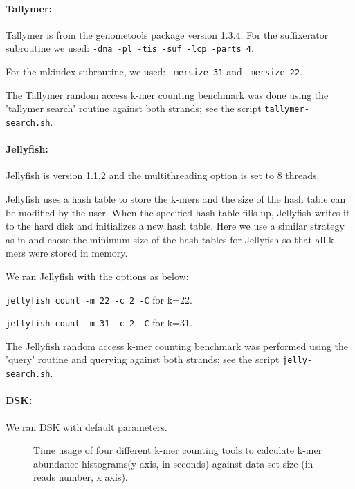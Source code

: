\documentclass{article}
\begin{document}
\paragraph{Tallymer:}
Tallymer is from the genometools package version 1.3.4. For the suffixerator subroutine we used:
{\tt -dna -pl -tis -suf -lcp -parts 4}.

For the mkindex subroutine, we used: {\tt -mersize 31} and {\tt -mersize 22}.

The Tallymer random access k-mer counting benchmark was done using the
'tallymer search' routine against both strands; see the script
{\tt tallymer-search.sh}.

\paragraph{Jellyfish:}
Jellyfish is version 1.1.2 and the multithreading option is set to 8 threads.

Jellyfish uses a hash table to store the k-mers and the size of the
hash table can be modified by the user.  When the specified hash table
fills up, Jellyfish writes it to the hard
disk and initializes a new hash table.  Here we use a
similar strategy as in \cite{Melsted2011} and chose the minimum size of the hash 
tables for Jellyfish so that all k-mers were stored in memory.

We ran Jellyfish with the options as below:

{\tt jellyfish count -m 22 -c 2 -C} for k=22.

{\tt jellyfish count -m 31 -c 2 -C} for k=31.

The Jellyfish random access k-mer counting benchmark was performed
using the 'query' routine and querying against both strands; see
the script {\tt jelly-search.sh}.

\paragraph{DSK:} We ran DSK with default parameters.








\begin{figure}
\caption{Time usage of four different k-mer counting tools to calculate k-mer abundance histograms(y axis, in seconds) against data set size (in reads number, x axis).}
\label{cmp_time}
\end{figure}
\end{document}
